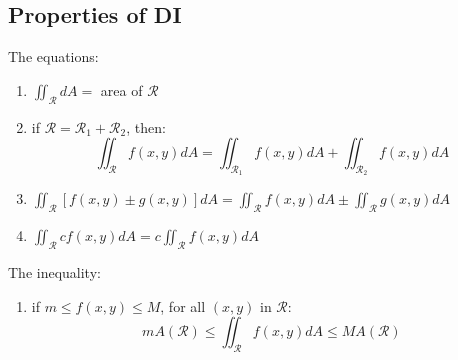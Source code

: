 \documentclass[UTF8,a4paper, 10pt, openany]{book}
\begin{document}
\subsection{Properties of DI}
The equations:
\begin{enumerate}
\item $\displaystyle\iint_{\mathcal{R}}dA=$ area of $\mathcal{R}$
\item if $\mathcal{R}=\mathcal{R}_1+\mathcal{R}_2$, then:
$$\iint_{\mathcal{R}}f(x,y)dA=\iint_{\mathcal{R}_1}f(x,y)dA+\iint_{\mathcal{R}_2}f(x,y)dA$$
\item $\displaystyle\iint_{\mathcal{R}}[f(x,y)\pm g(x,y)]dA=\displaystyle\iint_{\mathcal{R}}f(x,y)dA\pm \displaystyle\iint_{\mathcal{R}}g(x,y)dA$
\item $\displaystyle\iint_{\mathcal{R}}cf(x,y)dA=c\displaystyle\iint_{\mathcal{R}}f(x,y)dA$
\end{enumerate}
The inequality:
\begin{enumerate}
\item if $m\leq f(x,y) \leq M$, for all $(x,y)$ in $\mathcal{R}$:
$$mA(\mathcal{R})\leq \iint_{\mathcal{R}}f(x,y)dA \leq MA(\mathcal{R})$$
\end{enumerate}
\end{document}
